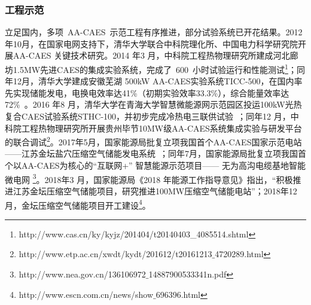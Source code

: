 \subsubsection{工程示范}
立足国内，多项~AA-CAES~示范工程有序推进，部分试验系统已开花结果\cite{CAES-Review-18-Rui-operation}。2012年10月，在国家电网支持下，清华大学联合中科院理化所、中国电力科学研究院开展AA-CAES 关键技术研究\cite{CAES-Review-17-Rui-salt}。2014 年3 月，中科院工程热物理研究所建成河北廊坊1.5MW先进CAES的集成实验系统，完成了~600~小时试验运行和性能测试\footnote{http://www.cas.cn/ky/kyjz/201404/t20140403\_4085514.shtml}；同年12月，清华大学建成安徽芜湖 500kW AA-CAES实验系统TICC-500，在国内率先实现储能发电，电换电效率达41\%（初期实验效率33.3\%），综合能量效率达72\%~\cite{CAES-Review-18-Rui-operation,TICC-15,TICC-16}。2016 年8 月，清华大学在青海大学智慧微能源网示范园区投运100kW光热复合CAES试验系统STHC-100，并初步完成冷热电三联供试验~\cite{ST-CAES-17,ST-CAES-CN-16-Rui,CAES-Review-18-Rui-operation}；同年12 月，中科院工程热物理研究所开展贵州毕节10MW级AA-CAES系统集成实验与研发平台的联合调试\footnote{http://www.etp.ac.cn/xwdt/kydt/201612/t20161213$\_$4720289.html}。2017年5月，国家能源局批复立项我国首个AA-CAES国家示范电站——江苏金坛盐穴压缩空气储能发电系统~\cite{CAES-Review-17-Rui-salt}；同年7月，国家能源局批复立项我国首个以AA-CAES为核心的“互联网+” 智慧能源示范项目—— 无为高沟电缆基地智能微电网\cite{CAES-Review-18-Rui-operation}
\footnote{http://www.nea.gov.cn/136106972$\_$14887900533341n.pdf}。2018年3 月，国家能源局《2018 年能源工作指导意见》指出，“积极推进江苏金坛压缩空气储能项目，研究推进100MW压缩空气储能电站”；2018年12月，金坛压缩空气储能项目开工建设\footnote{http://www.escn.com.cn/news/show$\_$696396.html}。

